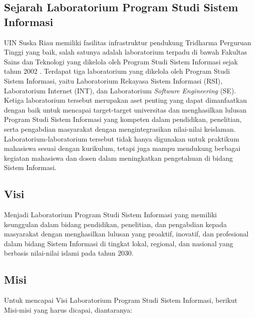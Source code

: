 \subsection{Sejarah Laboratorium Program Studi Sistem Informasi}
UIN Suska Riau memiliki fasilitas infrastruktur pendukung Tridharma Perguruan Tinggi yang baik, salah satunya adalah laboratorium terpadu di bawah Fakultas Sains dan Teknologi yang dikelola oleh Program Studi Sistem Informasi sejak tahun 2002 \cite{uin-suska-website}. Terdapat tiga laboratorium yang dikelola oleh Program Studi Sistem Informasi, yaitu Laboratorium Rekayasa Sistem Informasi (RSI), Laboratorium Internet (INT), dan Laboratorium \textit{Software Engineering} (SE). Ketiga laboratorium tersebut merupakan aset penting yang dapat dimanfaatkan dengan baik untuk mencapai target-target universitas dan menghasilkan lulusan Program Studi Sistem Informasi yang kompeten dalam pendidikan, penelitian, serta pengabdian masyarakat dengan mengintegrasikan nilai-nilai keislaman. Laboratorium-laboratorium tersebut tidak hanya digunakan untuk praktikum mahasiswa sesuai dengan kurikulum, tetapi juga mampu mendukung berbagai kegiatan mahasiswa dan dosen dalam meningkatkan pengetahuan di bidang Sistem Informasi.
\subsection{Visi}
Menjadi Laboratorium Program Studi Sistem Informasi yang memiliki keunggulan dalam bidang pendidikan, penelitian, dan pengabdian kepada masyarakat dengan menghasilkan lulusan yang proaktif, inovatif, dan profesional dalam bidang Sistem Informasi di tingkat lokal, regional, dan nasional yang berbasis nilai-nilai islami pada tahun 2030.
\subsection{Misi}
Untuk mencapai Visi Laboratorium Program Studi Sistem Informasi, berikut Misi-misi yang harus dicapai, diantaranya:


